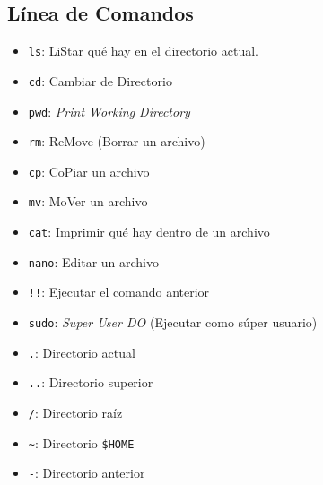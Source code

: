 \documentclass[aspectratio=43]{beamer}
\begin{document}
    \subsection{Línea de Comandos}
    \begin{frame}[fragile]{\secname}{\subsecname}
        \begin{itemize}
            \item \verb!ls!: LiStar qué hay en el directorio actual.
            \item \verb!cd!: Cambiar de Directorio
            \item \verb!pwd!: \textit{Print Working Directory}
            \item \verb!rm!: ReMove (Borrar un archivo)
            \item \verb!cp!: CoPiar un archivo
            \item \verb!mv!: MoVer un archivo
            \item \verb!cat!: Imprimir qué hay dentro de un archivo
            \item \verb!nano!: Editar un archivo
            \item \verb|!!|: Ejecutar el comando anterior
            \item \verb|sudo|: \textit{Super User DO} (Ejecutar como súper usuario)
        \end{itemize}
        \pause
        \begin{itemize}
            \item \verb!.!: Directorio actual
            \item \verb!..!: Directorio superior
            \item \verb!/!: Directorio raíz
            \item \verb!~!: Directorio \verb!$HOME!
            \item \verb!-!: Directorio anterior
        \end{itemize}
    \end{frame}
\end{document}
